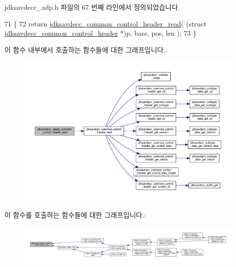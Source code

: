 jdksavdecc\+\_\+adp.\+h 파일의 67 번째 라인에서 정의되었습니다.


\begin{DoxyCode}
71 \{
72     \textcolor{keywordflow}{return} \hyperlink{group__jdksavdecc__avtp__common__control__header_ga92a6293fe53957c3ea12564fff690d18}{jdksavdecc\_common\_control\_header\_read}( (\textcolor{keyword}{struct} 
      \hyperlink{structjdksavdecc__common__control__header}{jdksavdecc\_common\_control\_header} *)p, base, pos, len );
73 \}
\end{DoxyCode}


이 함수 내부에서 호출하는 함수들에 대한 그래프입니다.\+:
\nopagebreak
\begin{figure}[H]
\begin{center}
\leavevmode
\includegraphics[width=350pt]{group__adpdu_gaa014d2ff90974366a024dac5a4f04cac_cgraph}
\end{center}
\end{figure}




이 함수를 호출하는 함수들에 대한 그래프입니다.\+:
\nopagebreak
\begin{figure}[H]
\begin{center}
\leavevmode
\includegraphics[width=350pt]{group__adpdu_gaa014d2ff90974366a024dac5a4f04cac_icgraph}
\end{center}
\end{figure}


